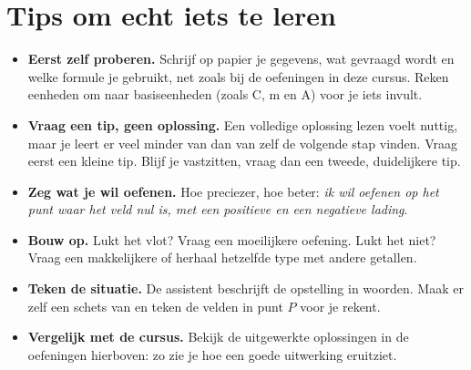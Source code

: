 \documentclass{ximera}
\begin{document}
\section{Tips om echt iets te leren}\label{sec:ai-tips}
\begin{itemize}
    \item \textbf{Eerst zelf proberen.} Schrijf op papier je gegevens, wat gevraagd wordt en welke formule je gebruikt, net zoals bij de oefeningen in deze cursus. Reken eenheden om naar basiseenheden (zoals C, m en A) voor je iets invult.
    \item \textbf{Vraag een tip, geen oplossing.} Een volledige oplossing lezen voelt nuttig, maar je leert er veel minder van dan van zelf de volgende stap vinden. Vraag eerst een kleine tip. Blijf je vastzitten, vraag dan een tweede, duidelijkere tip.
    \item \textbf{Zeg wat je wil oefenen.} Hoe preciezer, hoe beter: \emph{ik wil oefenen op het punt waar het veld nul is, met een positieve en een negatieve lading}.
    \item \textbf{Bouw op.} Lukt het vlot? Vraag een moeilijkere oefening. Lukt het niet? Vraag een makkelijkere of herhaal hetzelfde type met andere getallen.
    \item \textbf{Teken de situatie.} De assistent beschrijft de opstelling in woorden. Maak er zelf een schets van en teken de velden in punt $P$ voor je rekent.
    \item \textbf{Vergelijk met de cursus.} Bekijk de uitgewerkte oplossingen in de oefeningen hierboven: zo zie je hoe een goede uitwerking eruitziet.
\end{itemize}
\end{document}
